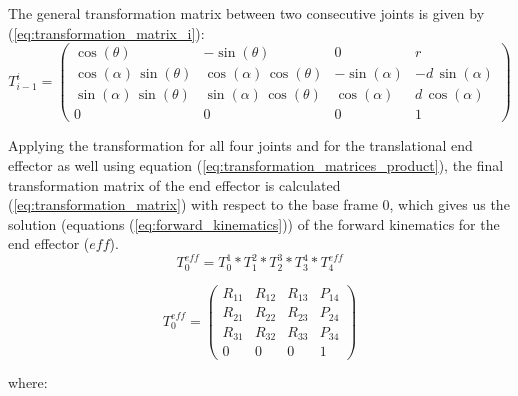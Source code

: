 \documentclass[a4paper,12pt]{article}
\begin{document}
The general transformation matrix between two consecutive joints is given by (\ref{eq:transformation_matrix_i}):
\begin{equation}
T_{i-1}^{i} = \left(\begin{array}{cccc}
\label{eq:transformation_matrix_i}
\cos\left(\theta \right) & -\sin\left(\theta \right) & 0 & r\\ 
\cos\left(\alpha \right)\,\sin\left(\theta \right) & \cos\left(\alpha \right)\,\cos\left(\theta \right) & -\sin\left(\alpha \right) & -d\,\sin\left(\alpha \right)\\ 
\sin\left(\alpha \right)\,\sin\left(\theta \right) & \sin\left(\alpha \right)\,\cos\left(\theta \right) & \cos\left(\alpha \right) & d\,\cos\left(\alpha \right)\\ 
0 & 0 & 0 & 1 
\end{array}\right)
\end{equation}

Applying the transformation for all four joints and for the translational end effector as well using equation (\ref{eq:transformation_matrices_product}), the final transformation matrix of the end effector is calculated (\ref{eq:transformation_matrix}) with respect to the base frame 0, which gives us the solution (equations (\ref{eq:forward_kinematics})) of the forward kinematics for the end effector (${eff}$).
\begin{equation} \label{eq:transformation_matrices_product}
    T_{0}^{eff} = T_{0}^{1} * T_{1}^{2} * T_{2}^{3} * T_{3}^{4} * T_{4}^{eff}
\end{equation}

\begin{equation}
\label{eq:transformation_matrix}
T_{0}^{eff} = \left(\begin{array}{cccc}
R_{11} & R_{12} & R_{13} & P_{14} \\
R_{21} & R_{22} & R_{23} & P_{24} \\
R_{31} & R_{32} & R_{33} & P_{34} \\
0 & 0 & 0 & 1
\end{array}\right)
\end{equation}

where:
\end{document}
